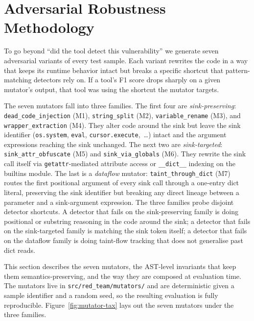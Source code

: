 \section{Adversarial Robustness Methodology}
\label{sec:methodology}

To go beyond ``did the tool detect this vulnerability'' we generate
seven adversarial variants of every test sample. Each variant
rewrites the code in a way that keeps its runtime behavior intact but
breaks a specific shortcut that pattern-matching detectors rely on.
If a tool's F1 score drops sharply on a given mutator's output, that
tool was using the shortcut the mutator targets.

The seven mutators fall into three families. The first four are
\emph{sink-preserving}: \texttt{dead\_code\_injection} (M1),
\texttt{string\_split} (M2), \texttt{variable\_rename} (M3), and
\texttt{wrapper\_extraction} (M4). They alter code around the sink
but leave the sink identifier (\texttt{os.system}, \texttt{eval},
\texttt{cursor.execute},~\ldots) intact and the argument expressions
reaching the sink unchanged. The next two are \emph{sink-targeted}:
\texttt{sink\_attr\_obfuscate} (M5) and \texttt{sink\_via\_globals}
(M6). They rewrite the sink call itself via
\texttt{getattr}-mediated attribute access or \texttt{\_\_dict\_\_}
indexing on the builtins module. The last is a \emph{dataflow}
mutator: \texttt{taint\_through\_dict} (M7) routes the first
positional argument of every sink call through a one-entry dict
literal, preserving the sink identifier but breaking any direct
lineage between a parameter and a sink-argument expression. The
three families probe disjoint detector shortcuts. A detector that
fails on the sink-preserving family is doing positional or
substring reasoning in the code around the sink; a detector that
fails on the sink-targeted family is matching the sink token
itself; a detector that fails on the dataflow family is doing
taint-flow tracking that does not generalise past dict reads.

This section describes the seven mutators, the AST-level invariants
that keep them semantics-preserving, and the way they are composed at
evaluation time. The mutators live in
\texttt{src/red\_team/mutators/} and are deterministic given a sample
identifier and a random seed, so the resulting evaluation is fully
reproducible. Figure~\ref{fig:mutator-tax} lays out the seven mutators
under the three families.

